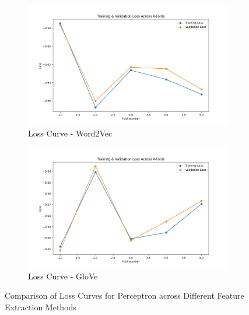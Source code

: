 \begin{figure}[H]
    \begin{subfigure}[b]{0.40\textwidth}
        \includegraphics[width=\textwidth]{img/report_info/img/2.1.Perceptron/best_perceptron_word2vec_loss.png}
        \caption{Loss Curve - Word2Vec}
        \label{fig:perc-word2vec-loss}
    \end{subfigure}
    \begin{subfigure}[b]{0.40\textwidth}
        \includegraphics[width=\textwidth]{img/report_info/img/2.1.Perceptron/best_perceptron_glove_loss.png}
        \caption{Loss Curve - GloVe}
        \label{fig:perc-glove-loss}
    \end{subfigure}
    
    \caption{Comparison of Loss Curves for Perceptron across Different Feature Extraction Methods}
    \label{fig:perc-loss-group}
\end{figure}

